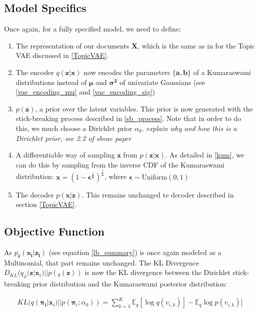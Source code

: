 \documentclass{report}
\begin{document}
\subsection{Model Specifics}
Once again, for a fully specified model, we need to define:
\begin{enumerate}
	\item The representation of our documents $\mathbf{X}$, which is the same as in for the Topic VAE discussed in \ref{TopicVAE}.
	\item The encoder $q(\mathbf{z}|\mathbf{x})$ now encodes the parameters $\{\mathbf{a}, \mathbf{b}\}$ of a Kumaraswami distributions instead of $\boldsymbol{\mu}$ and $\boldsymbol{\sigma^2}$ of univariate Gaussians (see \ref{vae_encoding_mu} and \ref{vae_encoding_sig})
	\item $p(\mathbf{z})$, a prior  over the latent variables. This prior is now generated with the stick-breaking process described in \ref{sb_process}. Note that in order to do this, we much choose a Dirichlet prior $\alpha_0$. \textit{explain why and how this is a Dirichlet prior, see 2.2 of sbvae paper}
	\item A differentiable way of sampling $\mathbf{z}$ from $p(\mathbf{z}|\mathbf{x})$. As detailed in \ref{kum}, we can do this by sampling from the inverse CDF of the Kumaraswami distribution: $\mathbf{x} = (1-\boldsymbol{\epsilon}^{\frac{1}{\mathbf{b}}})^{\frac{1}{\mathbf{a}}}$, where $\boldsymbol{\epsilon} \sim \text{Uniform}(0,1)$
	\item The decoder $p(\mathbf{x}|\mathbf{z})$. This remains unchanged te decoder described in section \ref{TopicVAE}.
\end{enumerate}

\subsection{Objective Function}
As $ p_\theta(\mathbf{x_i}|\mathbf{z_i})$ (see equation \ref{lb_summary}) is once again modeled as a Multinomial, that part  remains unchanged. The KL Divergence $D_{KL}(q_\phi (\mathbf{z}|\mathbf{x}_i)||p(_\theta(\mathbf{z}))$ is now the KL divergence between the Dirichlet stick-breaking prior distribution and the Kumaraswami posterior distribution:

\begin{align}
KL(q(\mathbf{\mathbf{\pi}_i}|\mathbf{x}_i)||p(\mathbf{\pi}_i;\alpha_0)) = \sum_{k=1}^{K}\mathbb{E}_q [\log q(v_{i,k})] - \mathbb{E}_q \log p(v_{i,k})]
\end{align}
\end{document}
